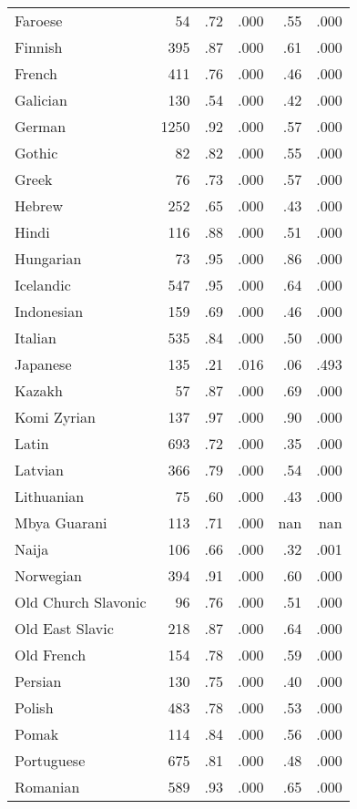 \begin{longtable}{lrrrrr}
    Faroese & 54 & .72 & .000 & .55 & .000 \\
    Finnish & 395 & .87 & .000 & .61 & .000 \\
    French & 411 & .76 & .000 & .46 & .000 \\
    Galician & 130 & .54 & .000 & .42 & .000 \\
    German & 1250 & .92 & .000 & .57 & .000 \\
    Gothic & 82 & .82 & .000 & .55 & .000 \\
    Greek & 76 & .73 & .000 & .57 & .000 \\
    Hebrew & 252 & .65 & .000 & .43 & .000 \\
    Hindi & 116 & .88 & .000 & .51 & .000 \\
    Hungarian & 73 & .95 & .000 & .86 & .000 \\
    Icelandic & 547 & .95 & .000 & .64 & .000 \\
    Indonesian & 159 & .69 & .000 & .46 & .000 \\
    Italian & 535 & .84 & .000 & .50 & .000 \\
    Japanese & 135 & .21 & .016 & .06 & .493 \\
    Kazakh & 57 & .87 & .000 & .69 & .000 \\
    Komi Zyrian & 137 & .97 & .000 & .90 & .000 \\
    Latin & 693 & .72 & .000 & .35 & .000 \\
    Latvian & 366 & .79 & .000 & .54 & .000 \\
    Lithuanian & 75 & .60 & .000 & .43 & .000 \\
    Mbya Guarani & 113 & .71 & .000 & nan & nan \\
    Naija & 106 & .66 & .000 & .32 & .001 \\
    Norwegian & 394 & .91 & .000 & .60 & .000 \\
    Old Church Slavonic & 96 & .76 & .000 & .51 & .000 \\
    Old East Slavic & 218 & .87 & .000 & .64 & .000 \\
    Old French & 154 & .78 & .000 & .59 & .000 \\
    Persian & 130 & .75 & .000 & .40 & .000 \\
    Polish & 483 & .78 & .000 & .53 & .000 \\
    Pomak & 114 & .84 & .000 & .56 & .000 \\
    Portuguese & 675 & .81 & .000 & .48 & .000 \\
    Romanian & 589 & .93 & .000 & .65 & .000 \\

\end{longtable}
